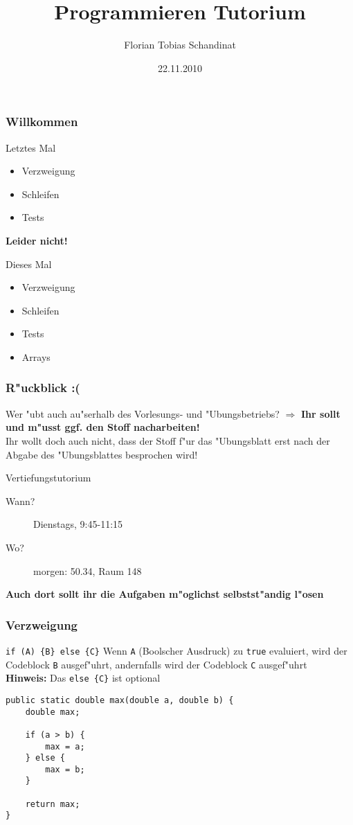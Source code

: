 \documentclass{beamer}
\title{Programmieren Tutorium}
\author{Florian Tobias Schandinat}
\date{22.11.2010}
\institute{FTS}
\begin{document}
\begin{frame}
\frametitle{Willkommen}
\pause
\begin{alertblock}{Letztes Mal}
\begin{itemize}
\item Verzweigung
\item Schleifen
\item Tests
\end{itemize}
\pause
\begin{center}
\textbf{\alert{Leider nicht!}}
\end{center}
\end{alertblock}

\pause

\begin{block}{Dieses Mal}
\begin{itemize}
\item Verzweigung
\item Schleifen
\item Tests
\item Arrays
\end{itemize}
\end{block}
\end{frame}


\begin{frame}
\frametitle{R"uckblick :(}
\begin{block}{Wer "ubt auch au"serhalb des Vorlesungs- und "Ubungsbetriebs?}
\pause
$\Rightarrow$ \textbf{Ihr sollt und m"usst ggf. den Stoff nacharbeiten!}\\[0.5em]
\pause
Ihr wollt doch auch nicht, dass der Stoff f"ur das "Ubungsblatt erst \alert{nach} der Abgabe des "Ubungsblattes besprochen wird!
\end{block}

\pause

\begin{block}{Vertiefungstutorium}
\begin{description}
\item[Wann?] Dienstags, 9:45-11:15
\item[Wo?] morgen: 50.34, Raum 148
\end{description}
\textbf{Auch dort sollt ihr die Aufgaben m"oglichst selbstst"andig l"osen}
\end{block}
\end{frame}


\begin{frame}[containsverbatim]
\frametitle{Verzweigung}
\begin{block}{\texttt{if (A) \{B\} else \{C\}}}
Wenn \texttt{A} (Boolscher Ausdruck) zu \texttt{true} evaluiert, wird der Codeblock \texttt{B} ausgef"uhrt, andernfalls wird der Codeblock \texttt{C} ausgef"uhrt\\
\textbf{Hinweis:} Das \texttt{else \{C\}} ist optional
\end{block}

\begin{lstlisting}
public static double max(double a, double b) {
	double max;

	if (a > b) {
		max = a;
	} else {
		max = b;
	}

	return max;
}
\end{lstlisting}
\end{frame}
\end{document}
